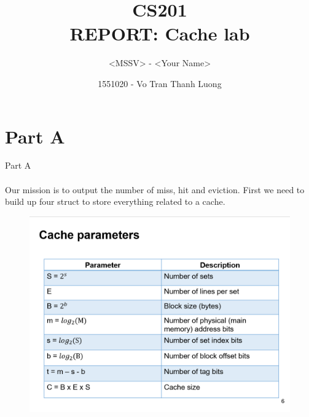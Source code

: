 \documentclass[a4paper]{article}
\begin{document}
\title{CS201\\REPORT: Cache lab}

\author{<MSSV> - <Your Name>}
\author{1551020 - Vo Tran Thanh Luong}
\maketitle


\setcounter{page}{1}
\tableofcontents
{}

\clearpage



\section{Part A}
Part A

\paragraph{} 

Our mission is to  output the number of miss, hit and eviction.
First we need to build up four struct to store everything related to a cache. 

\begin{figure}[h!]
  \includegraphics[width=\linewidth]{images/thetruth1.png}
  \caption{}
  \label{}
\end{figure}
\end{document}
